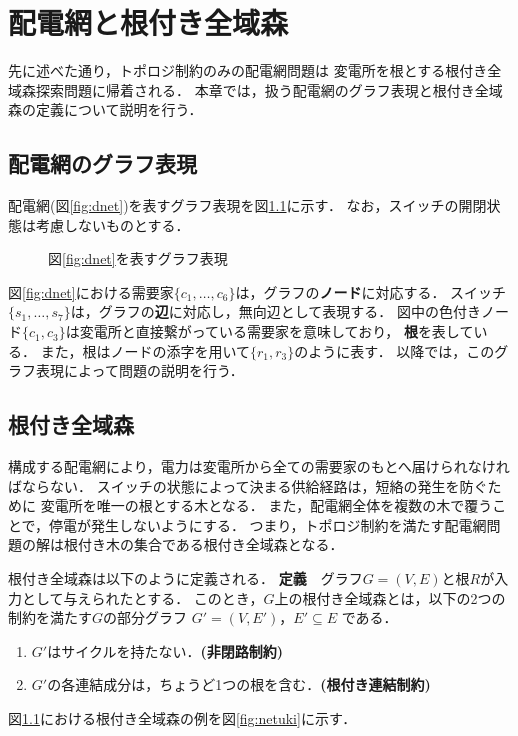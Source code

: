\chapter{配電網と根付き全域森} \label{chap:dnet}

先に述べた通り，トポロジ制約のみの配電網問題は
変電所を根とする根付き全域森探索問題に帰着される．
本章では，扱う配電網のグラフ表現と根付き全域森の定義について説明を行う．

\section{配電網のグラフ表現}
配電網(図\ref{fig:dnet})を表すグラフ表現を図\ref{fig:dnetgraph}に示す．
なお，スイッチの開閉状態は考慮しないものとする．

\begin{figure}[htbp]
 \centering
 
 \caption{図\ref{fig:dnet}を表すグラフ表現}
 \label{fig:dnetgraph}
\end{figure}

図\ref{fig:dnet}における需要家$\{c_1,\ldots,c_6\}$は，グラフの\textbf{ノード}に対応する．
スイッチ$\{s_1,\ldots,s_7\}$は，グラフの\textbf{辺}に対応し，無向辺として表現する．
図中の色付きノード$\{c_1,c_3\}$は変電所と直接繋がっている需要家を意味しており，
\textbf{根}を表している．
また，根はノードの添字を用いて$\{r_1,r_3\}$のように表す．
以降では，このグラフ表現によって問題の説明を行う．


\section{根付き全域森}
構成する配電網により，電力は変電所から全ての需要家のもとへ届けられなければならない．
スイッチの状態によって決まる供給経路は，短絡の発生を防ぐために
変電所を唯一の根とする木となる．
また，配電網全体を複数の木で覆うことで，停電が発生しないようにする．
つまり，トポロジ制約を満たす配電網問題の解は根付き木の集合である根付き全域森となる．

根付き全域森は以下のように定義される．\cite{Minato:dnet:netuki}
\newline
\textbf{定義}~~グラフ$G=(V,E)$と根$R$が入力として与えられたとする．
このとき，$G$上の根付き全域森とは，以下の2つの制約を満たす$G$の部分グラフ
$G'=(V,E')，E' \subseteq E$ である．
\begin{enumerate}
 \item $G'$はサイクルを持たない．\textbf{(非閉路制約)}
 \item $G'$の各連結成分は，ちょうど1つの根を含む．\textbf{(根付き連結制約)}
\end{enumerate}
図\ref{fig:dnetgraph}における根付き全域森の例を図\ref{fig:netuki}に示す．


